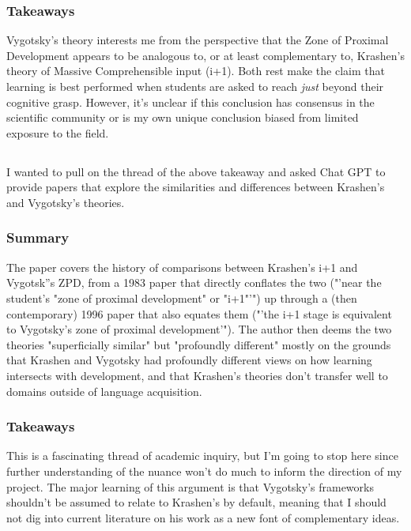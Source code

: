 \documentclass[
	letterpaper, %
]{jdf}
\begin{document}
\subsubsection{Takeaways}
Vygotsky's theory interests me from the perspective that the Zone of Proximal Development appears to be analogous to, or at least complementary to, Krashen's theory of Massive Comprehensible input (i+1). Both rest make the claim that learning is best performed when students are asked to reach \textit{just} beyond their cognitive grasp. However, it's unclear if this conclusion has consensus in the scientific community or is my own unique conclusion biased from limited exposure to the field.

\subsection{}
I wanted to pull on the thread of the above takeaway and asked Chat GPT to provide papers that explore the similarities and differences between Krashen's and Vygotsky's theories.

\subsubsection{Summary}
The paper covers the history of comparisons between Krashen's i+1 and Vygotsk''s ZPD, from a 1983 paper that directly conflates the two ("'near the student's "zone of proximal development" or "i+1"'") up through a (then contemporary) 1996 paper that also equates them ("'the i+1 stage is equivalent to Vygotsky's zone of proximal development'"). The author then deems the two theories "superficially similar" but "profoundly different" mostly on the grounds that Krashen and Vygotsky had profoundly different views on how learning intersects with development, and that Krashen's theories don't transfer well to domains outside of language acquisition.

\subsubsection{Takeaways}
This is a fascinating thread of academic inquiry, but I'm going to stop here since further understanding of the nuance won't do much to inform the direction of my project. The major learning of this argument is that Vygotsky's frameworks shouldn't be assumed to relate to Krashen's by default, meaning that I should not dig into current literature on his work as a new font of complementary ideas.
\end{document}
